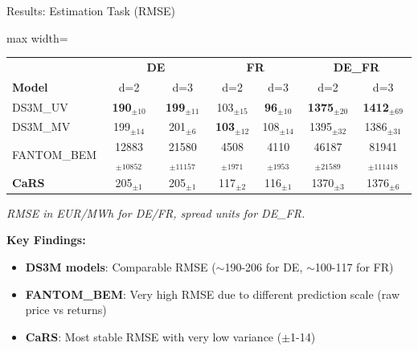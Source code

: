 \documentclass[aspectratio=169]{beamer}
\begin{document}
\begin{frame}{Results: Estimation Task (RMSE)}
\begin{table}
\centering
\small
\begin{adjustbox}{max width=\textwidth}
\begin{tabular}{l|cc|cc|cc}
\toprule
& \multicolumn{2}{c|}{\textbf{DE}} & \multicolumn{2}{c|}{\textbf{FR}} & \multicolumn{2}{c}{\textbf{DE\_FR}} \\
\textbf{Model} & d=2 & d=3 & d=2 & d=3 & d=2 & d=3 \\
\midrule
DS3M\_UV & \textbf{190}$_{\pm10}$ & \textbf{199}$_{\pm11}$ & 103$_{\pm15}$ & \textbf{96}$_{\pm10}$ & \textbf{1375}$_{\pm20}$ & \textbf{1412}$_{\pm69}$ \\
DS3M\_MV & 199$_{\pm14}$ & 201$_{\pm6}$ & \textbf{103}$_{\pm12}$ & 108$_{\pm14}$ & 1395$_{\pm32}$ & 1386$_{\pm31}$ \\
FANTOM\_BEM & 12883$_{\pm10852}$ & 21580$_{\pm11157}$ & 4508$_{\pm1971}$ & 4110$_{\pm1953}$ & 46187$_{\pm21589}$ & 81941$_{\pm111418}$ \\
\midrule
\textbf{CaRS} & 205$_{\pm1}$ & 205$_{\pm1}$ & 117$_{\pm2}$ & 116$_{\pm1}$ & 1370$_{\pm3}$ & 1376$_{\pm6}$ \\
\bottomrule
\end{tabular}
\end{adjustbox}
\end{table}

\vspace{0.2cm}
{\scriptsize \textit{RMSE in EUR/MWh for DE/FR, spread units for DE\_FR.}} %

\vspace{0.2cm}
\textbf{Key Findings:}
\begin{itemize}
    \item \textbf{DS3M models}: Comparable RMSE ($\sim$190-206 for DE, $\sim$100-117 for FR)
    \item \textbf{FANTOM\_BEM}: Very high RMSE due to different prediction scale (raw price vs returns)
    \item \textbf{CaRS}: Most stable RMSE with very low variance ($\pm$1-14)
\end{itemize}
\end{frame}
\end{document}

